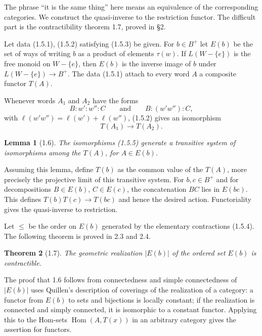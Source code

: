 \documentclass[11pt]{article}
\newtheorem{theorem}{Theorem}[section]
\newtheorem{lemma}[theorem]{Lemma}
\newcommand{\Hom}{\operatorname{Hom}}
\begin{document}
The phrase ``it is the same thing'' here means an equivalence of the corresponding categories. We construct the quasi-inverse to the restriction functor. The difficult part is the contractibility theorem 1.7, proved in §2.

Let data (1.5.1), (1.5.2) satisfying (1.5.3) be given. For $b\in B^+$ let $E(b)$ be the set of ways of writing $b$ as a product of elements $\tau(w)$. If $L(W-\{e\})$ is the free monoid on $W-\{e\}$, then $E(b)$ is the inverse image of $b$ under $L(W-\{e\})\to B^+$. The data (1.5.1) attach to every word $A$ a composite functor $T(A)$.

Whenever words $A_1$ and $A_2$ have the forms
\begin{equation}
B:w':w'':C \qquad\text{and}\qquad B:(w'w''):C,
\tag{1.5.4}
\end{equation}
with $\ell(w'w'')=\ell(w')+\ell(w'')$, (1.5.2) gives an isomorphism
\begin{equation}
T(A_1)\longrightarrow T(A_2).\tag{1.5.5}
\end{equation}

\begin{lemma}[1.6]
The isomorphisms (1.5.5) generate a transitive system of isomorphisms among the $T(A)$, for $A\in E(b)$.
\end{lemma}

Assuming this lemma, define $T(b)$ as the common value of the $T(A)$, more precisely the projective limit of this transitive system. For $b,c\in B^+$ and for decompositions $B\in E(b)$, $C\in E(c)$, the concatenation $BC$ lies in $E(bc)$. This defines $T(b)T(c)\to T(bc)$ and hence the desired action. Functoriality gives the quasi-inverse to restriction.

Let $\le$ be the order on $E(b)$ generated by the elementary contractions (1.5.4). The following theorem is proved in 2.3 and 2.4.

\begin{theorem}[1.7]
The geometric realization $|E(b)|$ of the ordered set $E(b)$ is contractible.
\end{theorem}

The proof that 1.6 follows from connectedness and simple connectedness of $|E(b)|$ uses Quillen's description of coverings of the realization of a category: a functor from $E(b)$ to sets and bijections is locally constant; if the realization is connected and simply connected, it is isomorphic to a constant functor. Applying this to the Hom-sets $\Hom(A,T(x))$ in an arbitrary category gives the assertion for functors.
\end{document}
